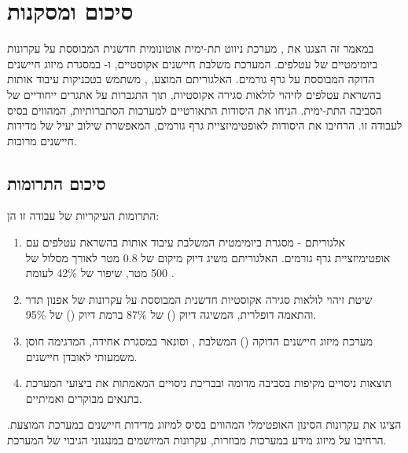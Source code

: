 
\section{סיכום ומסקנות}
\label{sec:conclusion}

במאמר זה הצגנו את , מערכת ניווט תת-ימית אוטונומית חדשנית המבוססת על עקרונות ביומימטיים של עטלפים. המערכת משלבת חיישנים אקוסטיים,  ו- במסגרת מיזוג חיישנים הדוקה המבוססת על גרף גורמים. האלגוריתם המוצע, , משתמש בטכניקות עיבוד אותות בהשראת עטלפים לזיהוי לולאות סגירה אקוסטיות, תוך התגברות על אתגרים ייחודיים של הסביבה התת-ימית. \citet{Thrun2005ProbRobotics} הניחו את היסודות התאורטיים למערכות  הסתברותיות, המהווים בסיס לעבודה זו. \citet{Grisetti2010g2o} הרחיבו את היסודות לאופטימיזציית גרף גורמים, המאפשרת שילוב יעיל של מדידות חיישנים מרובות.

\subsection{סיכום התרומות}
\label{sec:contributions_summary}

התרומות העיקריות של עבודה זו הן:

\begin{enumerate}
    \item אלגוריתם  - מסגרת  ביומימטית המשלבת עיבוד אותות בהשראת עטלפים עם אופטימיזציית גרף גורמים. האלגוריתם משיג דיוק מיקום של 0.8 מטר לאורך מסלול של 500 מטר, שיפור של 42\% לעומת .
    \item שיטת זיהוי לולאות סגירה אקוסטיות חדשנית המבוססת על עקרונות של אפנון תדר והתאמה דופלרית, המשיגה דיוק () של 87\% ברמת דיוק () של 95\%.
    \item מערכת מיזוג חיישנים הדוקה () המשלבת ,  וסונאר במסגרת  אחידה, המדגימה חוסן משמעותי לאובדן חיישנים.
    \item תוצאות ניסויים מקיפות בסביבה מדומה ובבריכת ניסויים המאמתות את ביצועי המערכת בתנאים מבוקרים ואמיתיים.
\end{enumerate}

\citet{Kalman1960} הציגו את עקרונות הסינון האופטימלי המהווים בסיס למיזוג מדידות חיישנים במערכת המוצעת. \citet{Julier1997CovarianceIntersection} הרחיבו על מיזוג מידע במערכות מבוזרות, עקרונות המיושמים במנגנוני הגיבוי של המערכת.


